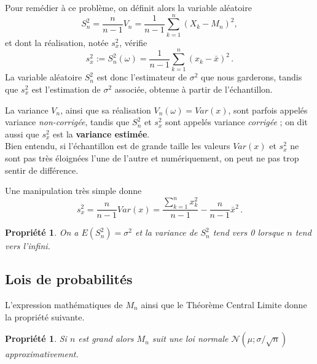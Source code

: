 \documentclass[12pt, a4paper]{book}
\newtheorem{prop}[thm]{Propriété}
\numberwithin{equation}{section}
\begin{document}
Pour remédier à ce problème, on définit alors la variable aléatoire 
$$
S_n^2 =\frac{n}{n-1} V_n = \frac{1}{n-1} \sum_{k=1}^n (X_k - M_n)^2,
$$
et dont la réalisation, notée $s^2_x$, vérifie
$$
s^2_x := S_n^2(\omega) = \frac{1}{n-1} \sum_{k=1}^n (x_k - \bar{x})^2\,.
$$
La variable aléatoire $S_n^2$ est donc l'estimateur de $\sigma^2$ que nous garderons, tandis que $s^2_x$ est l'estimation de $\sigma^2$ associée, obtenue à partir de l'échantillon. 

La variance $V_n$, ainsi que sa réalisation $V_n(\omega)=Var(x)$, sont parfois appelés variance \emph{non-corrigée}, tandis que $S_n^2$ et $s^2_x$ sont appelés variance \emph{corrigée} ; on dit aussi que $s^2_x$ est la {\bf variance estimée}. \\%
Bien entendu, si l'échantillon est de grande taille les valeurs $Var(x)$ et $s_x^2$ ne sont pas très éloignées l'une de l'autre et numériquement, on peut ne pas trop sentir de différence.

Une manipulation très simple donne
$$
s_x^2 = \frac{n}{n-1} Var(x) = \frac{\sum_{k=1}^n x_k^2}{n-1} - \frac{n}{n-1}\bar{x}^2 \,.
$$

\begin{prop}
On a $E(S^2_n) = \sigma^2$ et la variance de $S_n^2$ tend vers 0 lorsque $n$ tend vers l'infini.
\end{prop}



\subsection{Lois de probabilités}

L'expression mathématiques de $M_n$ ainsi que le Théorème Central Limite donne la propriété suivante.

\begin{prop}
Si $n$ est grand alors $M_n$ suit une loi normale $\mathcal{N}(\mu ; \sigma/\sqrt{n})$ approximativement.
\end{prop}
\end{document}
